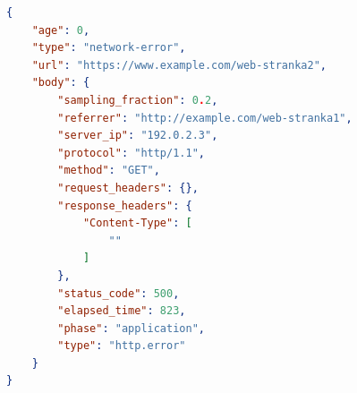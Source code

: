\begin{center}
\centering
\begin{lstlisting}[caption={\centering Príklad výsledného hlásenia typu NEL vytvoreného pravidlami popísanými vo výpise \ref{listing:priklad-nel-header}. Telo hlásenia bolo vygenerované pre zlyhanie vo fáze \code{"}\code{application"}. \mbox{Z webstránky} s adresou URL z poľa \code{referrer} bola zaslaná HTTP žiadosť typu \code{GET}, ktorú server obslúžil so statusom \code{500} -- server zlyhal pri obsluhe žiadosti. Dodatočne, tak ako bolo definované v pravidlách NEL, telo obsahuje aj hlavičku \code{Content-Type}, ktorá však vyplnená nebola kvôli celkovému zlyhaniu navrátenia cieľového zdroja v odpovedi.},
label=listing:priklad-nel-report, 
language=json, 
frame=tb,
xleftmargin=.085\textwidth, 
xrightmargin=.085\textwidth]
{
    "age": 0,
    "type": "network-error",
    "url": "https://www.example.com/web-stranka2",
    "body": {
        "sampling_fraction": 0.2,
        "referrer": "http://example.com/web-stranka1",
        "server_ip": "192.0.2.3",
        "protocol": "http/1.1",
        "method": "GET",
        "request_headers": {},
        "response_headers": {
            "Content-Type": [
                ""
            ]
        },
        "status_code": 500,
        "elapsed_time": 823,
        "phase": "application",
        "type": "http.error"
    }
}
\end{lstlisting}
\end{center}








